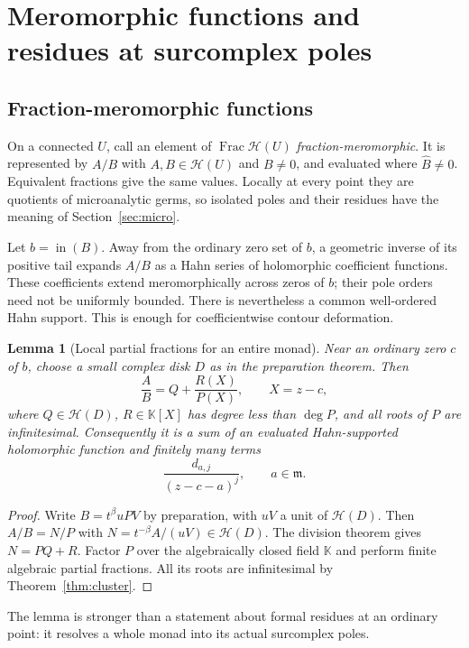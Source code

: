 \documentclass[11pt,oneside]{article}
\newtheorem{lemma}[theorem]{Lemma}
\theoremstyle{definition}\newtheorem{definition}[theorem]{Definition}
\newcommand{\K}{\mathbb K}
\newcommand{\HH}{\mathcal H}
\newcommand{\mm}{\mathfrak m}
\newcommand{\lead}{\operatorname{in}}
\begin{document}
\section{Meromorphic functions and residues at surcomplex poles}\label{sec:residue}
\subsection{Fraction-meromorphic functions}
On a connected $U$, call an element of $\operatorname{Frac}\HH(U)$ \emph{fraction-meromorphic}. It is represented by $A/B$ with $A,B\in\HH(U)$ and $B\ne0$, and evaluated where $\widehat B\ne0$. Equivalent fractions give the same values. Locally at every point they are quotients of microanalytic germs, so isolated poles and their residues have the meaning of Section~\ref{sec:micro}.

Let $b=\lead(B)$. Away from the ordinary zero set of $b$, a geometric inverse of its positive tail expands $A/B$ as a Hahn series of holomorphic coefficient functions. These coefficients extend meromorphically across zeros of $b$; their pole orders need not be uniformly bounded. There is nevertheless a common well-ordered Hahn support. This is enough for coefficientwise contour deformation.

\begin{lemma}[Local partial fractions for an entire monad]\label{lem:partial}
Near an ordinary zero $c$ of $b$, choose a small complex disk $D$ as in the preparation theorem. Then
\[
 \frac{A}{B}=Q+\frac{R(X)}{P(X)},\qquad X=z-c,
\]
where $Q\in\HH(D)$, $R\in\K[X]$ has degree less than $\deg P$, and all roots of $P$ are infinitesimal. Consequently it is a sum of an evaluated Hahn-supported holomorphic function and finitely many terms
\[
 \frac{d_{a,j}}{(z-c-a)^j},\qquad a\in\mm.
\]
\end{lemma}
\begin{proof}
Write $B=t^\beta uPV$ by preparation, with $uV$ a unit of $\HH(D)$. Then $A/B=N/P$ with $N=t^{-\beta}A/(uV)\in\HH(D)$. The division theorem gives $N=PQ+R$. Factor $P$ over the algebraically closed field $\K$ and perform finite algebraic partial fractions. All its roots are infinitesimal by Theorem~\ref{thm:cluster}.
\end{proof}
The lemma is stronger than a statement about formal residues at an ordinary point: it resolves a whole monad into its actual surcomplex poles.
\end{document}
